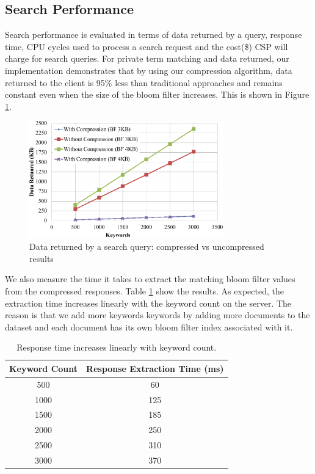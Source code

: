 \subsection{Search Performance}

Search performance is evaluated in terms of data returned by a query, response
time, CPU cycles used to process a search request and the cost(\$) CSP will
charge for search queries. 
For private term matching and data returned, our implementation demonstrates
that by using our compression algorithm, data returned to the client
is 95\% less than traditional approaches and remains constant even when the size
of the bloom filter increases. This is shown in Figure \ref{fig:compress}.

\begin{figure}[h!]
  \centering
  \includegraphics[width=3.3in]{figures/comp_compare.png}
  \caption{Data returned by a search query: compressed vs uncompressed results}
  \label{fig:compress}
\end{figure}

We also measure the time it takes to extract the matching bloom filter values
from the compressed responses.
Table \ref{tab:search_response_time} show the results. As expected,
the extraction time increases linearly with the keyword count
on the server. The reason is that we add more keywords
keywords by adding more documents to the dataset and each document
has its own bloom filter index associated with it.

\begin{table}[th!]
\centering
\caption{Response time increases linearly with keyword count.}
\label{tab:search_response_time}
\begin{tabular}{| c | c | }
\hline
Keyword Count & Response Extraction Time (ms) \\
\hline
500  &  60 \\
1000 &  125 \\
1500 &  185 \\
2000 &  250 \\
2500 &  310 \\
3000 &  370 \\
\hline
\end{tabular}
\end{table}


